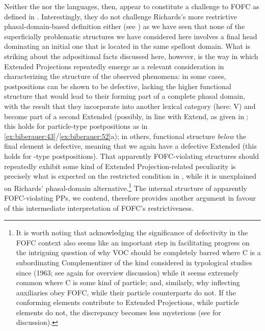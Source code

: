 \documentclass[output=paper]{LSP/langsci}
\begin{document}
Neither the  nor the  languages, then, appear to constitute a challenge to FOFC as defined in . Interestingly, they do not challenge Richards’s more restrictive phasal-domain-based definition either (see ) as we have seen that none of the superficially problematic structures we have considered here involves a final head dominating an initial one that is located in the same spellout domain. What is striking about the adpositional facts discussed here, however, is the way in which Extended Projections repeatedly emerge as a relevant consideration in characterizing the structure of the observed phenomena: in some cases, postpositions can be shown to be defective, lacking the higher functional structure that would lead to their forming part of a complete phasal domain, with the result that they incorporate into another lexical category (here: V) and become part of a second Extended  (possibly, in line with Extend, as given in ; this holds for particle-type postpositions as in \ref{ex:biberauer:43}\slash\ref{ex:biberauer:52}a); in others, functional structure \textit{below} the final element is defective, meaning that we again have a defective Extended  (this holds for -type postpositions). That apparently FOFC-violating structures should repeatedly exhibit some kind of Extended Projection-related peculiarity is precisely what is expected on the restricted condition in , while it is unexplained on Richards’ phasal-domain alternative.\footnote{It is worth noting that acknowledging the significance of defectivity in the FOFC context also seems like an important step in facilitating progress on the intriguing {question} of why VOC should be completely barred where C is a subordinating Complementizer of the kind considered in typological studies since \citeauthor{greenberg1963} (1963; see again \citealt{Dryer2009} for overview discussion) while it seems extremely common where C is some kind of particle; and, similarly, why inflecting auxiliaries obey FOFC, while their particle counterparts do not. If the conforming elements contribute to Extended Projections, while particle elements do not, the discrepancy becomes less mysterious (see \citealt{Biberauer2017optionalv2} for discussion).} The internal structure of apparently FOFC-violating PPs, we contend, therefore provides another argument in favour of this intermediate interpretation of FOFC’s restrictiveness. 
\end{document}
